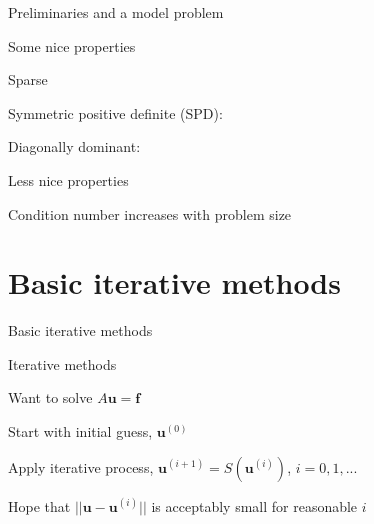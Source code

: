 \documentclass[18pt,xcolor=table]{beamer}
\begin{document}
\begin{frame}{Preliminaries and a model problem}
\begin{block}{Some nice properties}
\bit
\item Sparse
\item Symmetric positive definite (SPD):
\item Diagonally dominant:
\eit
\end{block}
\begin{block}{Less nice properties}
\bit
\item Condition number increases with problem size 
\eit
\end{block}
\end{frame}


\section{Basic iterative methods}

\begin{frame}{Basic iterative methods}
\begin{block}{Iterative methods}
\bit
\item Want to solve $A\mathbf{u} = \mathbf{f}$
\item Start with initial guess, $\mathbf{u}^{(0)}$
\item Apply iterative process, $\mathbf{u}^{(i+1)} = S(\mathbf{u}^{(i)})$, $i =0,1,...$
\item Hope that $||\mathbf{u} - \mathbf{u}^{(i)}||$ is acceptably small for reasonable $i$
\eit
\end{block}
\end{frame}
\end{document}
